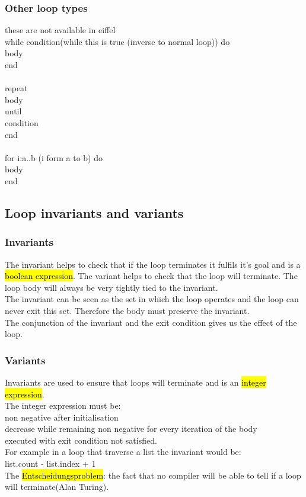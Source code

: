 \documentclass[11pt]{article}
\newcommand\tab[1][1cm]{\hspace*{#1}}
\begin{document}
\subsubsection{Other loop types}
these are not available in eiffel\\
while condition(while this is true (inverse to normal loop)) do\\\tab body\\end\\\\
repeat\\\tab body\\until \\\tab condition\\end\\\\
for i:a..b (i form a to b) do\\\tab body\\end 
\subsection{Loop invariants and variants}
\subsubsection{Invariants}
The invariant helps to check that if the loop terminates it fulfils it's goal and is a \hl{boolean expression}. The variant helps to check that the loop will terminate. The loop body will always be very tightly tied to the invariant.\\The invariant can be seen as the set in which the loop operates and the loop can never exit this set. Therefore the body must preserve the invariant.\\The conjunction of the invariant and the exit condition gives us the effect of the loop.
\subsubsection{Variants}
Invariants are used to ensure that loops will terminate and is an \hl{integer expression}.\\The integer expression must be:\\\tab non negative after initialisation\\\tab decrease while remaining non negative for every iteration of the body\\\tab executed with exit condition not satisfied.\\For example in a loop that traverse a list the invariant would be:\\\tab list.count - list.index + 1\\The \hl{Entscheidungsproblem}: the fact that no compiler will be able to tell if a loop will terminate(Alan Turing).
\end{document}
